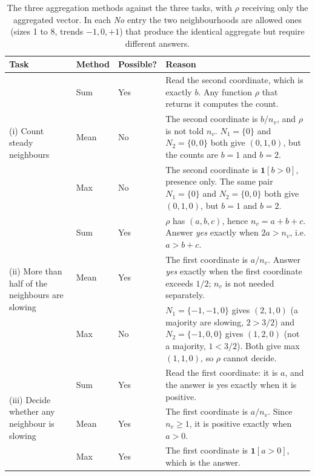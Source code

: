 \documentclass[11pt,letterpaper]{article}
\begin{document}
\begin{table}[htbp]
\centering
\footnotesize
\setlength{\tabcolsep}{5pt}
\renewcommand{\arraystretch}{0.92}
\begin{tabularx}{\textwidth}{@{}p{0.78in}p{0.52in}p{0.62in}X@{}}
\toprule
\textbf{Task} & \textbf{Method} & \textbf{Possible?} & \textbf{Reason} \\
\midrule
\multirow{3}{0.78in}{(i) Count steady neighbours}
 & Sum   & Yes & Read the second coordinate, which is exactly $b$. Any function $\rho$ that returns
                   it computes the count. \\
 \cmidrule{2-4}
 & Mean  & No  & The second coordinate is $b / n_v$, and $\rho$ is not told $n_v$. $N_1 = \{0\}$ and
                  $N_2 = \{0, 0\}$ both give $(0, 1, 0)$, but the counts are $b = 1$ and $b = 2$. \\
 \cmidrule{2-4}
 & Max   & No  & The second coordinate is $\mathbf{1}[b > 0]$, presence only. The same pair $N_1 = \{0\}$
                  and $N_2 = \{0, 0\}$ both give $(0, 1, 0)$, but $b = 1$ and $b = 2$. \\
\midrule
\multirow{3}{0.78in}{(ii) More than half of the neighbours are slowing}
 & Sum   & Yes & $\rho$ has $(a, b, c)$, hence $n_v = a + b + c$. Answer \emph{yes} exactly when
                 $2a > n_v$, i.e. $a > b + c$. \\
 \cmidrule{2-4}
 & Mean  & Yes & The first coordinate is $a / n_v$. Answer \emph{yes} exactly when the first coordinate
                 exceeds $1/2$; $n_v$ is not needed separately. \\
 \cmidrule{2-4}
 & Max   & No  & $N_1 = \{-1, -1, 0\}$ gives $(2, 1, 0)$ (a majority are slowing, $2 > 3/2$) and
                 $N_2 = \{-1, 0, 0\}$ gives $(1, 2, 0)$ (not a majority, $1 < 3/2$). Both give max
                 $(1, 1, 0)$, so $\rho$ cannot decide. \\
\midrule
\multirow{3}{0.78in}{(iii) Decide whether any neighbour is slowing}
 & Sum   & Yes & Read the first coordinate: it is $a$, and the answer is yes exactly when it is positive. \\
 \cmidrule{2-4}
 & Mean  & Yes & The first coordinate is $a / n_v$. Since $n_v \ge 1$, it is positive exactly when
                 $a > 0$. \\
 \cmidrule{2-4}
 & Max   & Yes & The first coordinate is $\mathbf{1}[a > 0]$, which is the answer. \\
\bottomrule
\end{tabularx}
\caption{The three aggregation methods against the three tasks, with $\rho$ receiving only the
aggregated vector. In each \emph{No} entry the two neighbourhoods are allowed ones (sizes 1 to
8, trends $-1, 0, +1$) that produce the identical aggregate but require different answers.}
\label{tab:aggregators}
\end{table}
\end{document}
